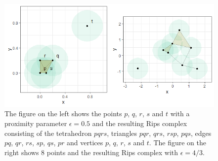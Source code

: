 \documentclass[letter,12pt]{article}
\begin{document}
\begin{figure}
    \centering
    \includegraphics[scale=0.8]{simplicial_complex.png}
    \caption{The figure on the left shows the points $p$, $q$, $r$, $s$ and $t$ with a proximity parameter $\epsilon = 0.5$ and the resulting Rips complex consisting of the tetrahedron $pqrs$, triangles $pqr$, $qrs$, $rsp$,  $pqs$, edges $pq$, $qr$, $rs$, $sp$, $qs$, $pr$ and vertices $p$, $q$, $r$, $s$ and $t$. The figure on the right shows $8$ points and the resulting Rips complex with $\epsilon=4/3$.}
    \label{fig:tetrahedron}
\end{figure}

\end{document}
